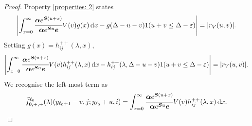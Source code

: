 \begin{proof}
                Property \ref{properties: 2} states
                \begin{align}
                	\left|\int_{x=0}^\infty \cfrac{\boldsymbol \alpha e^{\boldsymbol{S}(u+x)} }{\boldsymbol \alpha e^{\boldsymbol{S}u} \boldsymbol e} V(v)g(x)\, \mathrm{d} x -g(\Delta-u-v) 1(u+v\leq\Delta-\varepsilon)\right| =  |r_V(u,v)|.
                \end{align}
                Setting \(g(x) = h_{ij}^{++}(\lambda,x)\), 
                \begin{align}
                	\left|\int_{x=0}^\infty \cfrac{\boldsymbol \alpha e^{\boldsymbol{S}(u+x)} }{\boldsymbol \alpha e^{\boldsymbol{S}u} \boldsymbol e} V(v)h_{ij}^{++}(\lambda,x)\, \mathrm{d} x -h_{ij}^{++}(\lambda,\Delta-u-v) 1(u+v\leq\Delta-\varepsilon)\right| =  |r_V(u,v)|.
                \end{align}
                We recognise the left-most term as 
                \[\widehat f^{\ell_0}_{0,+,+}(\lambda)(y_{\ell_0+1}-v,j; y_{\ell_0}+u,i) = \int_{x=0}^\infty \cfrac{\boldsymbol \alpha e^{\boldsymbol{S}(u+x)} }{\boldsymbol \alpha e^{\boldsymbol{S}u} \boldsymbol e} V(v)h_{ij}^{++}(\lambda,x)\, \mathrm{d} x.\]
                

\end{proof}
